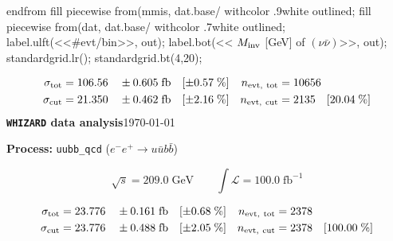 \documentclass[12pt]{article}
\begin{document}
\begin{gmlfile}
\begin{center}
\begin{gmlgraph*}
  endfrom
  fill piecewise from(mmis, dat.base/\) withcolor .9white outlined;
  fill piecewise from(dat, dat.base/\) withcolor .7white outlined;
  label.ulft(<<\#evt/bin>>, out);
  label.bot(<< $M_{\rm inv}$ [\textrm{GeV}] of $(\nu\bar\nu)$>>, out);
  standardgrid.lr();
  standardgrid.bt(4,20);
\end{gmlgraph*}
\end{center}
%
\begin{align*}
  \sigma_{\rm tot} &=   106.56     \quad \pm  0.605    \;\textrm{fb}
   \quad [\pm    0.57\;\%]
 & n_{\rm evt,\ tot} &=        10656
 \\
  \sigma_{\rm cut} &=   21.350     \quad \pm  0.462    \;\textrm{fb}
   \quad [\pm    2.16\;\%]
 & n_{\rm evt,\ cut} &=         2135  \quad 
  [   20.04 \;\%]
\end{align*}
%
%
\newpage
\noindent\textbf{\large\texttt{WHIZARD} data analysis}\hfill\today
\begin{flushleft}
\textbf{Process:} 
  \verb|uubb_qcd| ($ e^- e^+ \to u \bar u b \bar b$) \\
\end{flushleft}
%
\begin{displaymath}
  \sqrt{s} =   209.0    \;\textrm{GeV}\qquad
  \int\mathcal{L} =   100.0    \;\textrm{fb}^{-1}
\end{displaymath}
\begin{center} \unitlength 1mm
\end{center}
%
\begin{align*}
  \sigma_{\rm tot} &=   23.776     \quad \pm  0.161    \;\textrm{fb}
   \quad [\pm    0.68\;\%]
 & n_{\rm evt,\ tot} &=         2378
 \\
  \sigma_{\rm cut} &=   23.776     \quad \pm  0.488    \;\textrm{fb}
   \quad [\pm    2.05\;\%]
 & n_{\rm evt,\ cut} &=         2378  \quad 
  [  100.00 \;\%]
\end{align*}
%
%
 
\end{gmlfile}
\end{document}
